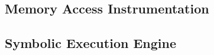 



\subsection{Memory Access Instrumentation}
















\subsection{Symbolic Execution Engine}


